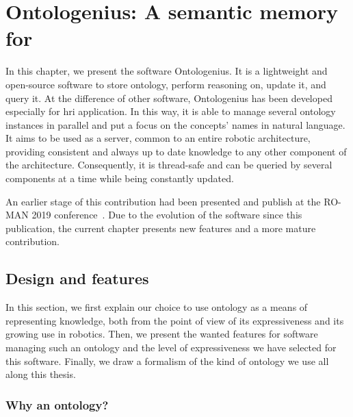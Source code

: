 \ifdefined{}
\else
\setcounter{chapter}{2} %
\dominitoc
\faketableofcontents
\fi

\chapter{Ontologenius: A semantic memory for }
\label{chap:ontologenius}
\minitoc

In this chapter, we present the software Ontologenius. It is a lightweight and open-source software to store ontology, perform reasoning on, update it, and query it. At the difference of other software, Ontologenius has been developed especially for \acrlong{hri} application. In this way, it is able to manage several ontology instances in parallel and put a focus on the concepts' names in natural language. It aims to be used as a server, common to an entire robotic architecture, providing consistent and always up to date knowledge to any other component of the architecture. Consequently, it is thread-safe and can be queried by several components at a time while being constantly updated.

An earlier stage of this contribution had been presented and publish at the RO-MAN 2019 conference~\cite{sarthou_2019_ontologenius}. Due to the evolution of the software since this publication, the current chapter presents new features and a more mature contribution.

\section{Design and features}

In this section, we first explain our choice to use ontology as a means of representing knowledge, both from the point of view of its expressiveness and its growing use in robotics. Then, we present the wanted features for software managing such an ontology and the level of expressiveness we have selected for this software. Finally, we draw a formalism of the kind of ontology we use all along this thesis.

\subsection{Why an ontology?}

